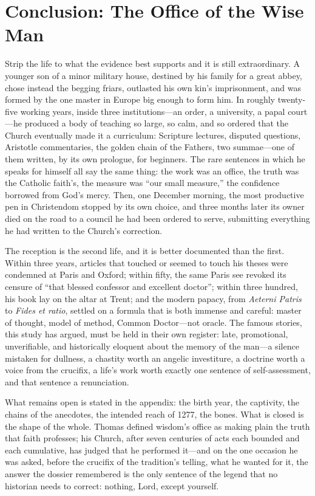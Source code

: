 \section{Conclusion: The Office of the Wise Man}

Strip the life to what the evidence best supports and it is still
extraordinary. A younger son of a minor military house, destined by his
family for a great abbey, chose instead the begging friars, outlasted
his own kin's imprisonment, and was formed by the one master in Europe
big enough to form him. In roughly twenty-five working years, inside
three institutions---an order, a university, a papal court---he
produced a body of teaching so large, so calm, and so ordered that the
Church eventually made it a curriculum: Scripture lectures, disputed
questions, Aristotle commentaries, the golden chain of the Fathers, two
summae---one of them written, by its own prologue, for beginners. The
rare sentences in which he speaks for himself all say the same thing:
the work was an office, the truth was the Catholic faith's, the measure
was ``our small measure,'' the confidence borrowed from God's mercy.
Then, one December morning, the most productive pen in Christendom
stopped by its own choice, and three months later its owner died on the
road to a council he had been ordered to serve, submitting everything
he had written to the Church's correction.

The reception is the second life, and it is better documented than the
first. Within three years, articles that touched or seemed to touch his
theses were condemned at Paris and Oxford; within fifty, the same Paris
see revoked its censure of ``that blessed confessor and excellent
doctor''; within three hundred, his book lay on the altar at Trent; and
the modern papacy, from \textit{Aeterni Patris} to \textit{Fides et
ratio}, settled on a formula that is both immense and careful: master
of thought, model of method, Common Doctor---not oracle. The famous
stories, this study has argued, must be held in their own register:
late, promotional, unverifiable, and historically eloquent about the
memory of the man---a silence mistaken for dullness, a chastity worth
an angelic investiture, a doctrine worth a voice from the crucifix, a
life's work worth exactly one sentence of self-assessment, and that
sentence a renunciation.

What remains open is stated in the appendix: the birth year, the
captivity, the chains of the anecdotes, the intended reach of 1277, the
bones. What is closed is the shape of the whole. Thomas defined wisdom's
office as making plain the truth that faith professes; his Church, after
seven centuries of acts each bounded and each cumulative, has judged
that he performed it---and on the one occasion he was asked, before the
crucifix of the tradition's telling, what he wanted for it, the answer
the dossier remembered is the only sentence of the legend that no
historian needs to correct: nothing, Lord, except yourself.
